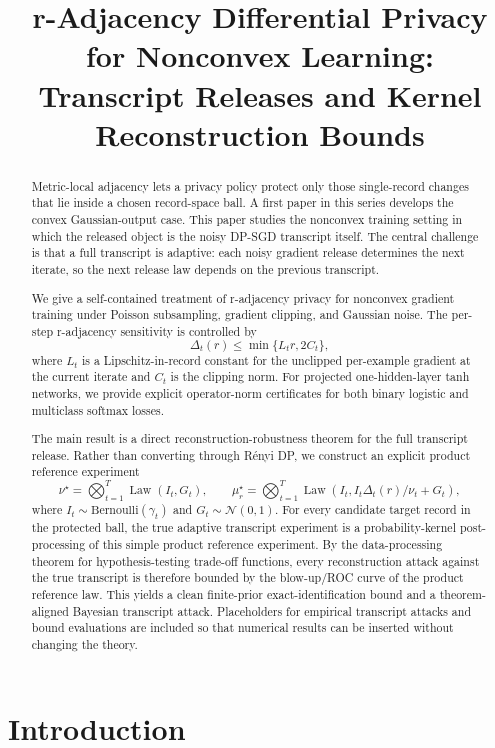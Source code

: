 \documentclass[conference,compsoc]{IEEEtran}
\title{r-Adjacency Differential Privacy for Nonconvex Learning:\\Transcript Releases and Kernel Reconstruction Bounds}
\author{}
\DeclareMathOperator{\Law}{Law}
\begin{document}
\maketitle

\begin{abstract}
Metric-local adjacency lets a privacy policy protect only those single-record changes that lie inside a chosen record-space ball. A first paper in this series develops the convex Gaussian-output case. This paper studies the nonconvex training setting in which the released object is the noisy DP-SGD transcript itself. The central challenge is that a full transcript is adaptive: each noisy gradient release determines the next iterate, so the next release law depends on the previous transcript.

We give a self-contained treatment of r-adjacency privacy for nonconvex gradient training under Poisson subsampling, gradient clipping, and Gaussian noise. The per-step r-adjacency sensitivity is controlled by
\[
\Delta_t(r)\le \min\{L_t r,2C_t\},
\]
where $L_t$ is a Lipschitz-in-record constant for the unclipped per-example gradient at the current iterate and $C_t$ is the clipping norm. For projected one-hidden-layer tanh networks, we provide explicit operator-norm certificates for both binary logistic and multiclass softmax losses.

The main result is a direct reconstruction-robustness theorem for the full transcript release. Rather than converting through R\'enyi DP, we construct an explicit product reference experiment
\[
\nu^\star=\bigotimes_{t=1}^T\Law(I_t,G_t),
\qquad
\mu_r^\star=\bigotimes_{t=1}^T\Law(I_t,I_t\Delta_t(r)/\nu_t+G_t),
\]
where $I_t\sim\mathrm{Bernoulli}(\gamma_t)$ and $G_t\sim\mathcal N(0,1)$. For every candidate target record in the protected ball, the true adaptive transcript experiment is a probability-kernel post-processing of this simple product reference experiment. By the data-processing theorem for hypothesis-testing trade-off functions, every reconstruction attack against the true transcript is therefore bounded by the blow-up/ROC curve of the product reference law. This yields a clean finite-prior exact-identification bound and a theorem-aligned Bayesian transcript attack. Placeholders for empirical transcript attacks and bound evaluations are included so that numerical results can be inserted without changing the theory.
\end{abstract}

\section{Introduction}
\end{document}
